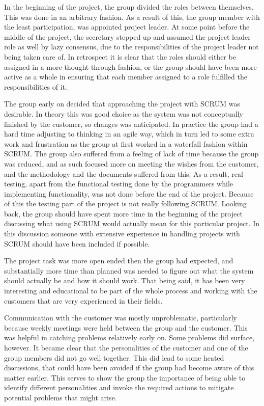 \documentclass[11pt]{book}
\begin{document}
In the beginning of the project, the group divided the roles between themselves. This was done in an arbitrary fashion. As a result of this, the group member with the least participation, was appointed project leader. At some point before the middle of the project, the secretary stepped up and assumed the project leader role as well by lazy consensus, due to the responsibilities of the project leader not being taken care of. In retrospect it is clear that the roles should either be assigned in a more thought through fashion, or the group should have been more active as a whole in ensuring that each member assigned to a role fulfilled the responsibilities of it.

The group early on decided that approaching the project with SCRUM was desirable. In theory this was good choice as the system was not conceptually finished by the customer, so changes was anticipated. In practice the group had a hard time adjusting to thinking in an agile way, which in turn led to some extra work and frustration as the group at first worked in a waterfall fashion within SCRUM. The group also suffered from a feeling of lack of time because the group was reduced, and as such focused more on meeting the wishes from the customer, and the methodology and the documents suffered from this. As a result, real testing, apart from the functional testing done by the programmers while implementing functionality, was not done before the end of the project. Because of this the testing part of the project is not really following SCRUM. Looking back, the group should have spent more time in the beginning of the project discussing what using SCRUM would actually mean for this particular project. In this discussion someone with extensive experience in handling projects with SCRUM should have been included if possible.

The project task was more open ended then the group had expected, and substantially more time than planned was needed to figure out what the system should actually be and how it should work. That being said, it has been very interesting and educational to be part of the whole process and working with the customers that are very experienced in their fields.

Communication with the customer was mostly unproblematic, particularly because weekly meetings were held between the group and the customer. This was helpful in catching problems relatively early on. Some problems did surface, however. It became clear that the personalities of the customer and one of the group members did not go well together. This did lead to some heated discussions, that could have been avoided if the group had become aware of this matter earlier. This serves to show the group the importance of being able to identify different personalities and invoke the required actions to mitigate potential problems that might arise.
\end{document}
